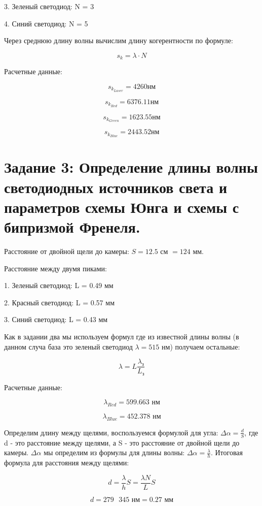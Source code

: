 \documentclass[12pt, a4paper]{report}
\begin{document}
3. Зеленый светодиод: N = 3

4. Синий светодиод: N = 5 

Через среднюю длину волны вычислим длину когерентности по формуле: 

\[ s_k = \lambda \cdot  N  \] 

Расчетные данные:

\[ s_{k_{Laser} }  = 4260 \text{нм}    \] 

\[ s_{k_{Red} }  = 6376.11 \text{нм}    \] 

\[ s_{k_{Green} }  = 1623.55 \text{нм}    \] 

\[ s_{k_{Blue} }  =  2443.52 \text{нм}    \] 

\section{Задание 3: Определение длины волны светодиодных источников
света и параметров схемы Юнга и схемы с бипризмой Френеля.}

Расстояние от двойной щели до камеры: \( S = 12.5 \text{ см } = 124  \) мм.

Расстояние между двумя пиками: 

1.  Зеленый светодиод: L = 0.49 мм

2. Красный светодиод: L = 0.57 мм

3. Синий светодиод: L = 0.43 мм

Как в задании два мы используем формул где из известной длины волны (в данном случа база это зеленый светодиод \( \lambda = 515 \text{ нм}  \)) получаем остальные: 

\[ \lambda = L \frac{\lambda _{\text{з} }  } {L _{\text{з} }}\] 

Расчетные данные:

\[ \lambda_{Red} = 599.663 \text{ нм}  \] 

\[ \lambda_{Blue} = 452.378\text{ нм}  \] 

Определим длину между щелями, воспользуемся формулой для угла: \( \displaystyle  \Delta \alpha  = \frac{d}{ S }  \), где d - это расстояние между щелями, а S - это расстояние от двойной щели до камеры.
\( \Delta \alpha  \) мы определим из формулы для длины волны: \( \displaystyle \Delta \alpha = \frac{\lambda}{h}   \). Итоговая формула для расстояния между щелями: 

\[ d = \frac{\lambda}{ h }  S = \frac{\lambda N }{L} S \] 

\[ d= 279 \text{ } 345 \text{ нм} = 0.27 \text{ мм} \] 
\end{document}
